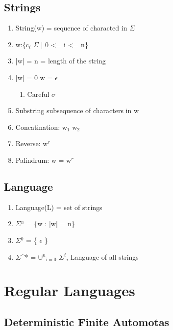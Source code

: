 \documentclass[11pt]{article}
\begin{document}
\subsection{Strings}
\label{sec-1.2}

\begin{enumerate}
\item String(w) = sequence of characted in $\Sigma$
\item w:\{c$_i$ \in $\Sigma$ | 0 <= i <= n\}
\item |w| = n = length of the string
\item |w| = 0 \rightarrow w = $\epsilon$

\begin{enumerate}
\item Careful $\sigma$ \neq \emptyset
\end{enumerate}

\item Substring subsequence of characters in w
\item Concatination: w$_1$ \cdot w$_2$
\item Reverse: w$^r$
\item Palindrum: w = w$^r$
\end{enumerate}
\subsection{Language}
\label{sec-1.3}

\begin{enumerate}
\item Language(L) = set of strings
\item $\Sigma$$^n$ = \{w : |w| = n\}
\item $\Sigma$$^0$ = \{ $\epsilon$ \}
\item $\Sigma$^* = $\cup$$^n$$_{\mathrm{i=0}}$ $\Sigma$$^i$, Language of all strings
\end{enumerate}
\section{Regular Languages}
\label{sec-2}

\subsection{Deterministic Finite Automotas}
\label{sec-2.1}
\end{document}
